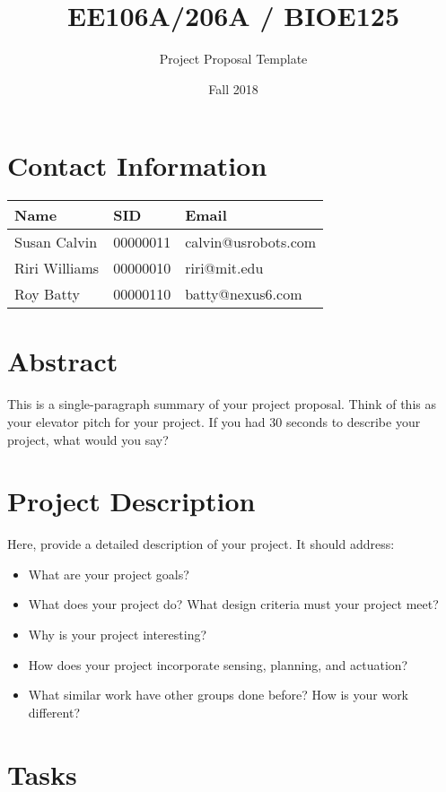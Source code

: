 \documentclass[letterpaper]{article}
\title{\textbf{EE106A/206A / BIOE125}}
\author{Project Proposal Template} %
\date{Fall 2018}
\begin{document}
\maketitle

\section{Contact Information}


\begin{tabular}[h]{l|l|l}
\textbf{Name} & \textbf{SID} & \textbf{Email} \\
\hline
Susan Calvin & 00000011 & calvin@usrobots.com \\
Riri Williams & 00000010 & riri@mit.edu \\
Roy Batty & 00000110 & batty@nexus6.com \\
\end{tabular}

\section{Abstract}

This is a single-paragraph summary of your project proposal. Think of this as your elevator pitch for your project. If you had 30 seconds to describe your project, what would you say?

\section{Project Description}

Here, provide a detailed description of your project. It should address:

\begin{itemize}
\item What are your project goals?
\item What does your project do? What design criteria must your project meet?
\item Why is your project interesting?
\item How does your project incorporate sensing, planning, and actuation?
\item What similar work have other groups done before? How is your work different?
\end{itemize}

\section{Tasks}
\end{document}
